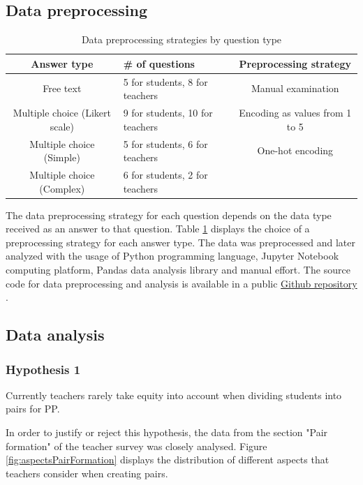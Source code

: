 \documentclass[conference]{IEEEtran}
\begin{document}
\subsection{Data preprocessing}
\begin{table}[h]
    \begin{tabular}{ |c|p{50px}|c| }
        \hline
        Answer type & \# of questions & Preprocessing strategy\\
        \hline
        Free text & 5 for students, 8 for teachers & Manual examination\\
        \hline
        Multiple choice (Likert scale) & 9 for students, 10 for teachers & Encoding as values from 1 to 5\\
        \hline
        Multiple choice (Simple) & 5 for students, 6 for teachers & One-hot encoding \\
        \hline
        Multiple choice (Complex) & 6 for students, 2 for teachers &  \\ 
        \hline
    \end{tabular}
    \caption{Data preprocessing strategies by question type}
    \label{tab:table1}
\end{table}

The data preprocessing strategy for each question depends on the data type received as an answer to that question. Table \ref{tab:table1} displays the choice of a preprocessing strategy for each answer type. The data was preprocessed and later analyzed with the usage of Python programming language, Jupyter Notebook computing platform, Pandas data analysis library and manual effort. The source code for data preprocessing and analysis is available in a public \href{https://github.com/lerastromtsova/pair-programming-equity}{Github repository} \cite{Repository}.

\subsection{Data analysis}
\subsubsection{Hypothesis 1}
Currently teachers rarely take equity into account when dividing students into pairs for PP.

In order to justify or reject this hypothesis, the data from the section "Pair formation" of the teacher survey was closely analysed. Figure \ref{fig:aspectsPairFormation} displays the distribution of different aspects that teachers consider when creating pairs.
\end{document}
